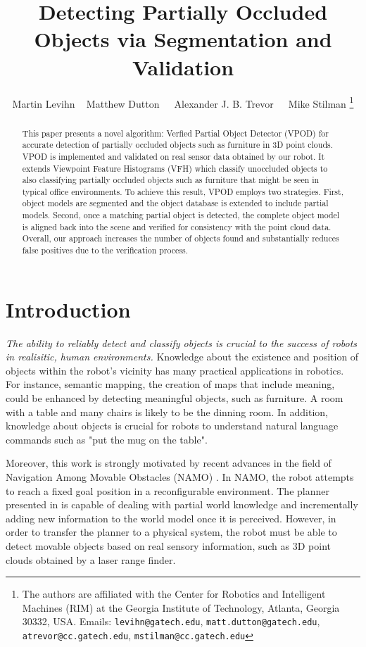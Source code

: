 \documentclass[letterpaper, 10pt, conference]{ieeeconf}
\title{\LARGE \bf
Detecting Partially Occluded Objects via Segmentation and Validation
}
\author{Martin Levihn$\;\;\;$ Matthew Dutton $\;\;\;$ Alexander J. B. Trevor $\;\;\;$ Mike Stilman%
\thanks{The authors are affiliated with the Center for Robotics and Intelligent Machines (RIM) at the Georgia Institute of Technology, Atlanta, Georgia 30332, USA. Emails: \texttt{levihn@gatech.edu}, \texttt{matt.dutton@gatech.edu}, \texttt{atrevor@cc.gatech.edu}, \texttt{mstilman@cc.gatech.edu}}
}
\newcommand{\shrinka}{\def\baselinestretch{0.995}\large\normalsize}
\begin{document}
\shrinka

\maketitle
\thispagestyle{empty}
\pagestyle{empty}


\begin{abstract}
This paper presents a novel algorithm: Verfied Partial Object Detector (VPOD)
for accurate detection of partially occluded objects such as furniture in 3D
point clouds. VPOD is implemented and validated on real sensor data obtained by
our robot. It extends Viewpoint Feature Histograms (VFH) which classify
unoccluded objects to also classifying partially occluded objects such as
furniture that might be seen in typical office environments. To achieve this
result, VPOD employs two strategies. First, object models are segmented and the
object database is extended to include partial models. Second, once a matching partial object is detected, the complete object model is aligned back into the scene and verified for consistency with the point cloud data. Overall, our approach increases the number of objects found and substantially reduces false positives due to the verification process.
\end{abstract}


\section{Introduction}
\label{intro}

\textit{The ability to reliably detect and classify objects is crucial to the success of robots in realisitic, human environments.} 
Knowledge about the existence and position of objects within the robot's vicinity has many practical applications in robotics. 
For instance, semantic mapping, the creation of maps that include meaning, could
be enhanced by detecting meaningful objects, such as furniture. A room with a
table and many chairs is likely to be the dinning room. In addition, knowledge
about objects is crucial for robots to understand natural language commands such
as "put the mug on the table".

Moreover, this work is strongly motivated by recent advances in the field of
Navigation Among Movable Obstacles (NAMO) \cite{Wu2010}. In NAMO, the robot attempts to reach a fixed goal position in a reconfigurable environment. The planner presented in \cite{Wu2010} is capable of dealing with partial world knowledge and incrementally adding new information to the world model once it is perceived. However, in order to transfer the planner to a physical system, the robot must be able to detect movable objects based on real sensory information, such as 3D point clouds obtained by a laser range finder.
\end{document}

